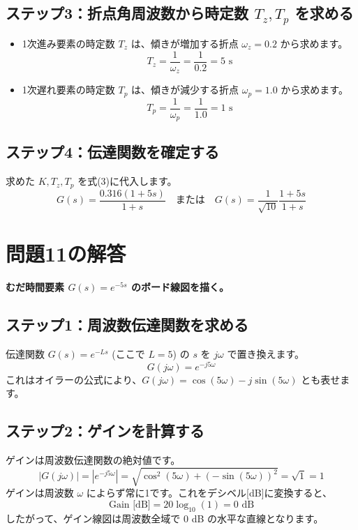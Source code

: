 \documentclass[11pt,a4paper]{ltjsarticle} %
\begin{document}
\subsection*{ステップ3：折点角周波数から時定数 $T_z, T_p$ を求める}
\begin{itemize}
    \item 1次進み要素の時定数 $T_z$ は、傾きが増加する折点 $\omega_z = 0.2$ から求めます。
    \begin{equation*}
        T_z = \frac{1}{\omega_z} = \frac{1}{0.2} = 5 \text{ s}
    \end{equation*}
    \item 1次遅れ要素の時定数 $T_p$ は、傾きが減少する折点 $\omega_p = 1.0$ から求めます。
    \begin{equation*}
        T_p = \frac{1}{\omega_p} = \frac{1}{1.0} = 1 \text{ s}
    \end{equation*}
\end{itemize}

\subsection*{ステップ4：伝達関数を確定する}
求めた $K, T_z, T_p$ を式(3)に代入します。
\begin{equation}
    G(s) = \frac{0.316(1+5s)}{1+s} \quad \text{または} \quad G(s) = \frac{1}{\sqrt{10}} \frac{1+5s}{1+s}
\end{equation}

\section{問題11の解答}
\textbf{むだ時間要素 $G(s) = e^{-5s}$ のボード線図を描く。}

\subsection*{ステップ1：周波数伝達関数を求める}
伝達関数 $G(s) = e^{-Ls}$ (ここで $L=5$) の $s$ を $j\omega$ で置き換えます。
\begin{equation*}
    G(j\omega) = e^{-j5\omega}
\end{equation*}
これはオイラーの公式により、$G(j\omega) = \cos(5\omega) - j\sin(5\omega)$ とも表せます。

\subsection*{ステップ2：ゲインを計算する}
ゲインは周波数伝達関数の絶対値です。
\begin{equation*}
    |G(j\omega)| = |e^{-j5\omega}| = \sqrt{\cos^2(5\omega) + (-\sin(5\omega))^2} = \sqrt{1} = 1
\end{equation*}
ゲインは周波数 $\omega$ によらず常に1です。これをデシベル[dB]に変換すると、
\begin{equation*}
    \text{Gain [dB]} = 20 \log_{10}(1) = 0 \text{ dB}
\end{equation*}
したがって、ゲイン線図は周波数全域で 0 dB の水平な直線となります。
\end{document}
